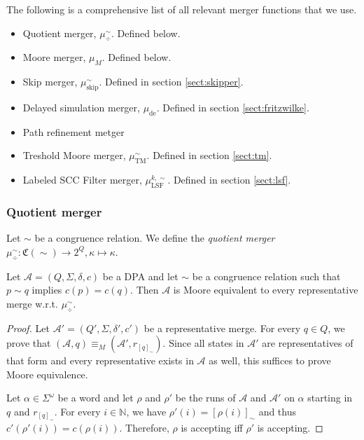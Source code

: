 The following is a comprehensive list of all relevant merger functions that we use.

\begin{itemize}
	\item Quotient merger, $\mu_\div^\sim$. Defined below.
	\item Moore merger, $\mu_M$. Defined below.
	\item Skip merger, $\mu_\text{skip}^\sim$. Defined in section \ref{sect:skipper}.
	\item Delayed simulation merger, $\mu_\text{de}$. Defined in section \ref{sect:fritzwilke}.
	\item Path refinement metger %
	\item Treshold Moore merger, $\mu_\text{TM}^\sim$. Defined in section \ref{sect:tm}.
	\item Labeled SCC Filter merger, $\mu_\text{LSF}^{k,\sim}$. Defined in section \ref{sect:lsf}.
\end{itemize}

\vspace{5pt}

\subsubsection{Quotient merger}
\begin{defn}
	Let $\sim$ be a congruence relation. We define the \emph{quotient merger} $\mu^\sim_\div : \mathfrak{C}(\sim) \rightarrow 2^Q, \kappa \mapsto \kappa$. 
\end{defn}


\begin{lem}
\label{lem:general:congrel_prio_implies_moore}
	Let $\mathcal{A} = (Q, \Sigma, \delta, c)$ be a DPA and let $\sim$ be a congruence relation such that $p \sim q$ implies $c(p) = c(q)$. Then $\mathcal{A}$ is Moore equivalent to every representative merge w.r.t. $\mu_\div^\sim$.
\end{lem} 

\begin{proof} %
	Let $\mathcal{A}' = (Q', \Sigma, \delta', c')$ be a representative merge. For every $q \in Q$, we prove that $(\mathcal{A}, q) \equiv_M (\mathcal{A}', r_{[q]_\sim})$. Since all states in $\mathcal{A}'$ are representatives of that form and every representative exists in $\mathcal{A}$ as well, this suffices to prove Moore equivalence.
	
	Let $\alpha \in \Sigma^\omega$ be a word and let $\rho$ and $\rho'$ be the runs of $\mathcal{A}$ and $\mathcal{A}'$ on $\alpha$ starting in $q$ and $r_{[q]_\sim}$. For every $i \in \mathbb{N}$, we have $\rho'(i) = [\rho(i)]_\sim$ and thus $c'(\rho'(i)) = c(\rho(i))$. Therefore, $\rho$ is accepting iff $\rho'$ is accepting.
\end{proof}

